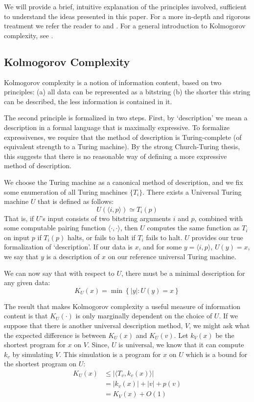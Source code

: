 \documentclass{article}
\begin{document}
We will provide a brief, intuitive explanation of the principles involved, sufficient to understand the ideas presented in this paper. For a more in-depth and rigorous treatment we refer the reader to \cite{li2004similarity} and \cite{cilibrasi2005clustering}. For a general introduction to Kolmogorov complexity, see \cite{li1997introduction}.

\subsection*{Kolmogorov Complexity}

Kolmogorov complexity is a notion of information content, based on two principles: (a) all data can be represented as a bitstring (b) the shorter this string can be described, the less information is contained in it.

The second principle is formalized in two steps. First, by `description' we mean a description in a formal language that is maximally expressive. To formalize expressivenes, we require that the method of description is Turing-complete (of equivalent strength to a Turing machine). By the strong Church-Turing thesis, this suggests that there is no reasonable way of defining a more expressive method of description.

We choose the Turing machine as a canonical method of description, and we fix some enumeration of all Turing machines $\{T_i\}$. There exists a Universal Turing machine $U$ that is defined as follows:
\[
U(\langle i, p\rangle) \simeq T_i(p)
\] 
That is, if $U$'s input consists of two bitstring arguments $i$ and $p$, combined with some computable pairing function $\langle \cdot, \cdot\rangle$, then $U$ computes the same function as $T_i$ on input $p$ if $T_i(p)$ halts, or fails to halt if $T_i$ fails to halt. $U$ provides our true formalization of `description'. If our data is $x$, and for some $y = \langle i, p\rangle$, $U(y) = x$, we say that $y$ is a description of $x$ on our reference universal Turing machine.  

We can now say that with respect to $U$, there must be a minimal description for any given data:
\[
K_U(x) = \min\left \{|y| : U(y) = x\right\} 
\]

The result that makes Kolmogorov complexity a useful measure of information content is that $K_U(\cdot)$ is only marginally dependent on the choice of $U$. If we suppose that there is another universal description method, $V$, we might ask what the expected difference is between $K_U(x)$ and $K_U(v)$. Let $k_V(x)$ be the shortest program for $x$ on $V$. Since, $U$ is universal, we know that it can compute $k_v$ by simulating $V$. This simulation is a program for $x$ on $U$ which is a bound for the shortest program on $U$:
\begin{align*}
K_U(x) 	&\leq |\langle T_v, k_v(x)\rangle|\\ 
		&=  |k_v(x)| + |v| + p(v) \\
		&=  K_V(x) + O(1)
\end{align*}
\end{document}
